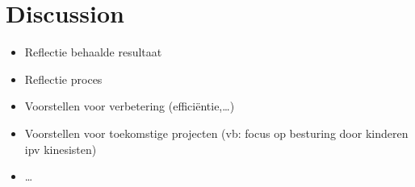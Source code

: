 \chapter{Discussion}

\begin{itemize}
\item Reflectie behaalde resultaat
\item Reflectie proces
\item Voorstellen voor verbetering (effici\"entie,\ldots)
\item Voorstellen voor toekomstige projecten (vb: focus op besturing door kinderen ipv kinesisten)
\item \ldots
\end{itemize}